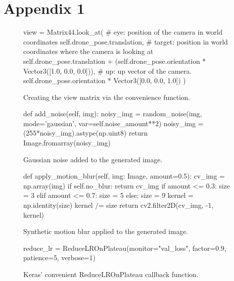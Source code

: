 \chapter{Appendix 1}

\begin{figure}[h]
	\center
	\begin{python}
		view = Matrix44.look_at(
			# eye: position of the camera in world coordinates
			self.drone_pose.translation,
			# target: position in world coordinates where the camera is looking at
			self.drone_pose.translation + (self.drone_pose.orientation *
										   Vector3([1.0, 0.0, 0.0])),
			# up: up vector of the camera.
			self.drone_pose.orientation * Vector3([0.0, 0.0, 1.0])
		)
	\end{python}
	\caption[The  function]{Creating the view matrix via the
	convenience  function.}
\end{figure}

\begin{figure}[h!]
    \centering
    \begin{python}
        def add_noise(self, img):
            noisy_img = random_noise(img, mode='gaussian',
                                     var=self.noise_amount**2)
            noisy_img = (255*noisy_img).astype(np.uint8)
            return Image.fromarray(noisy_img)
    \end{python}
    \caption{Gaussian noise added to the generated image.}
\end{figure}

\begin{figure}[h!]
    \centering
    \begin{python}
        def apply_motion_blur(self, img: Image, amount=0.5):
            cv_img = np.array(img)
            if self.no_blur: return cv_img
            if amount <= 0.3:
                size = 3
            elif amount <= 0.7:
                size = 5
            else:
                size = 9
            kernel = np.identity(size)
            kernel /= size
            return cv2.filter2D(cv_img, -1, kernel)
    \end{python}
    \caption{Synthetic motion blur applied to the generated image.}
\end{figure}


\begin{figure}[h]
    \centering
    \begin{python}
        reduce_lr = ReduceLROnPlateau(monitor="val_loss",
            factor=0.9, patience=5, verbose=1)
    \end{python}
    \caption{Keras' convenient ReduceLROnPlateau callback function.}
\end{figure}
